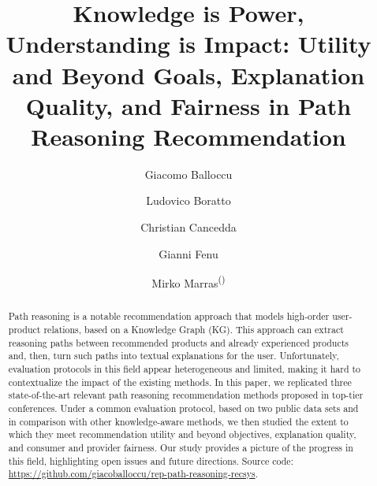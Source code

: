 \documentclass[runningheads]{llncs}
\begin{document}
\title{Knowledge is Power, Understanding is Impact: Utility and Beyond Goals, Explanation Quality, and Fairness in Path Reasoning Recommendation}

\author{Giacomo Balloccu \and
Ludovico Boratto \and
Christian Cancedda \and
Gianni Fenu \and
Mirko Marras\textsuperscript{(\Letter)}}



\maketitle            

\begin{abstract}
Path reasoning is a notable recommendation approach that models high-order user-product relations, based on a Knowledge Graph (KG). 
This approach can extract reasoning paths between recommended products and already experienced products and, then, turn such paths into textual explanations for the user. 
Unfortunately, evaluation protocols in this field appear heterogeneous and limited, making it hard to contextualize the impact of the existing methods.
In this paper, we replicated three state-of-the-art relevant path reasoning recommendation methods proposed in top-tier conferences. 
Under a common evaluation protocol, based on two public data sets and in comparison with other knowledge-aware methods, we then studied 
the extent to which they meet recommendation utility and beyond objectives, explanation quality, and consumer and provider fairness. 
Our study provides a picture of the progress in this field, highlighting open issues and future directions. 
Source code: \url{https://github.com/giacoballoccu/rep-path-reasoning-recsys}.
\end{abstract}
\end{document}
